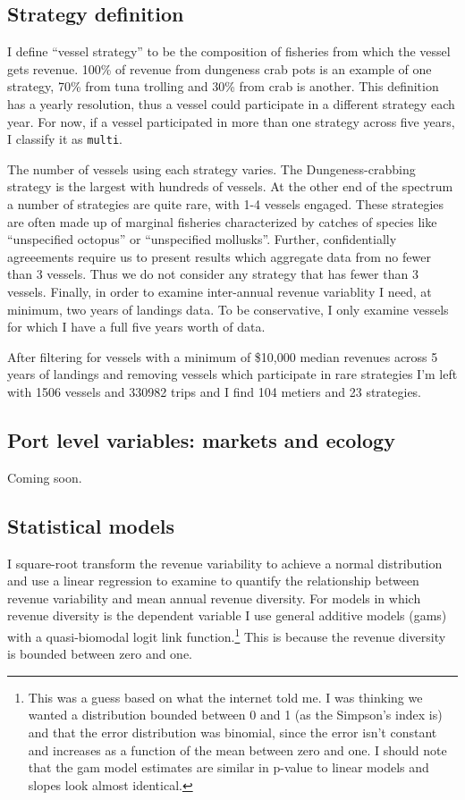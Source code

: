 \documentclass[]{article}
\let\rmarkdownfootnote\footnote%
\def\footnote{\protect\rmarkdownfootnote}
\begin{document}
\subsection{Strategy definition}\label{strategy-definition}

I define ``vessel strategy'' to be the composition of fisheries from
which the vessel gets revenue. 100\% of revenue from dungeness crab pots
is an example of one strategy, 70\% from tuna trolling and 30\% from
crab is another. This definition has a yearly resolution, thus a vessel
could participate in a different strategy each year. For now, if a
vessel participated in more than one strategy across five years, I
classify it as \texttt{multi}.

The number of vessels using each strategy varies. The Dungeness-crabbing
strategy is the largest with hundreds of vessels. At the other end of
the spectrum a number of strategies are quite rare, with 1-4 vessels
engaged. These strategies are often made up of marginal fisheries
characterized by catches of species like ``unspecified octopus'' or
``unspecified mollusks''. Further, confidentially agreeements require us
to present results which aggregate data from no fewer than 3 vessels.
Thus we do not consider any strategy that has fewer than 3 vessels.
Finally, in order to examine inter-annual revenue variablity I need, at
minimum, two years of landings data. To be conservative, I only examine
vessels for which I have a full five years worth of data.

After filtering for vessels with a minimum of \$10,000 median revenues
across 5 years of landings and removing vessels which participate in
rare strategies I'm left with 1506 vessels and 330982 trips and I find
104 metiers and 23 strategies.

\subsection{Port level variables: markets and
ecology}\label{port-level-variables-markets-and-ecology}

Coming soon.

\subsection{Statistical models}\label{statistical-models}

I square-root transform the revenue variability to achieve a normal
distribution and use a linear regression to examine to quantify the
relationship between revenue variability and mean annual revenue
diversity. For models in which revenue diversity is the dependent
variable I use general additive models (gams) with a quasi-biomodal
logit link function.\footnote{This was a guess based on what the
  internet told me. I was thinking we wanted a distribution bounded
  between 0 and 1 (as the Simpson's index is) and that the error
  distribution was binomial, since the error isn't constant and
  increases as a function of the mean between zero and one. I should
  note that the gam model estimates are similar in p-value to linear
  models and slopes look almost identical.} This is because the revenue
diversity is bounded between zero and one.
\end{document}
